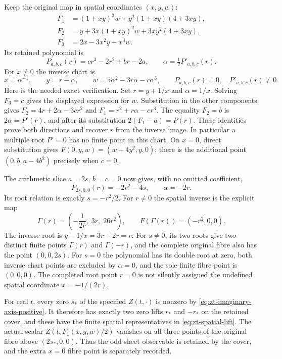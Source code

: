 Keep the original map in spatial coordinates $(x,y,w)$:
\begin{align*}
 F_1&=(1+xy)^3w+y^2(1+xy)(4+3xy),\\
 F_2&=y+3x(1+xy)^2w+3xy^2(4+3xy),\\
 F_3&=2x-3x^2y-x^3w.
\end{align*}
Its retained polynomial is
\[
 P_{a,b,c}(r)=cr^3-2r^2+br-2a,\qquad
 \alpha=\tfrac12P'_{a,b,c}(r).
\]
For $x\ne0$ the inverse chart is
\begin{equation}
 x=\alpha^{-1},\qquad y=r-\alpha,\qquad
 w=5\alpha^2-3r\alpha-c\alpha^3,
 \qquad P_{a,b,c}(r)=0,\quad P'_{a,b,c}(r)\ne0.
 \label{eq:zt-original-inverse}
\end{equation}
Here is the needed exact verification.  Set $r=y+1/x$ and
$\alpha=1/x$.  Solving $F_3=c$ gives the displayed expression for
$w$.  Substitution in the other components gives
$F_2=4r+2\alpha-3cr^2$ and $F_1=r^2+r\alpha-cr^3$.
The equality $F_2=b$ is $2\alpha=P'(r)$, and after its substitution
$2(F_1-a)=P(r)$.  These identities prove both directions and recover
$r$ from the inverse image.  In particular a multiple root $P'=0$
has no finite point in this chart.  On $x=0$, direct substitution
gives $F(0,y,w)=(w+4y^2,y,0)$; there is the additional point
$(0,b,a-4b^2)$ precisely when $c=0$.

The arithmetic slice $a=2s$, $b=c=0$ now gives, with no omitted
coefficient,
\[
 P_{2s,0,0}(r)=-2r^2-4s,\qquad \alpha=-2r.
\]
Its root relation is exactly $s=-r^2/2$.  For $r\ne0$ the spatial
inverse is the explicit map
\begin{equation}
 \Gamma(r)=\left(-\frac1{2r},\;3r,\;26r^2\right),
 \qquad F(\Gamma(r))=(-r^2,0,0).
 \label{eq:zt-spatial-lift}
\end{equation}
The inverse root is $y+1/x=3r-2r=r$.  For $s\ne0$, its two
roots give two distinct finite points $\Gamma(r)$ and $\Gamma(-r)$,
and the complete original fibre also has the point $(0,0,2s)$.
For $s=0$ the polynomial has its double root at zero, both inverse
chart points are excluded by $\alpha=0$, and the sole finite fibre
point is $(0,0,0)$.  The completed root point $r=0$ is not silently
assigned the undefined spatial coordinate $x=-1/(2r)$.

For real $t$, every zero $s_*$ of the specified $Z(t,\cdot)$ is
nonzero by \eqref{eq:zt-imaginary-axis-positive}.  It therefore has
exactly two zero lifts $r_*$ and $-r_*$ on the retained cover, and
these have the finite spatial representatives in
\eqref{eq:zt-spatial-lift}.  The actual scalar
$Z(t,F_1(x,y,w)/2)$ vanishes on all three points of the original fibre
above $(2s_*,0,0)$.  Thus the odd sheet observable is retained by the
cover, and the extra $x=0$ fibre point is separately recorded.


